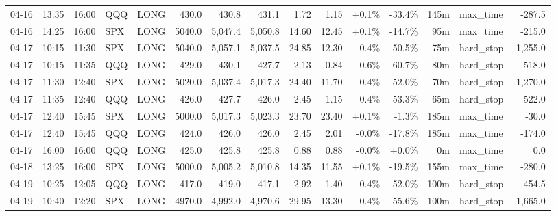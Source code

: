 \documentclass[11pt,a4paper,twoside]{article}
\begin{document}
\begin{landscape}
\begin{center}
\begin{longtable}{>{\color{txtmain}}l l l l l r r r r r r r r >{\color{txtmain}}l r}
04-16 & 13:35 & 16:00 & QQQ & LONG & 430.0 & 430.8 & 431.1 & 1.72 & 1.15 & \textcolor{wingreen}{+0.1\%} & \textcolor{lossred}{-33.4\%} & 145m & max\_time & \textcolor{lossred}{-287.5} \\
04-16 & 14:25 & 16:00 & SPX & LONG & 5040.0 & 5,047.4 & 5,050.8 & 14.60 & 12.45 & \textcolor{wingreen}{+0.1\%} & \textcolor{lossred}{-14.7\%} & 95m & max\_time & \textcolor{lossred}{-215.0} \\
04-17 & 10:15 & 11:30 & SPX & LONG & 5040.0 & 5,057.1 & 5,037.5 & 24.85 & 12.30 & \textcolor{lossred}{-0.4\%} & \textcolor{lossred}{-50.5\%} & 75m & hard\_stop & \textcolor{lossred}{-1,255.0} \\
04-17 & 10:15 & 11:35 & QQQ & LONG & 429.0 & 430.1 & 427.7 & 2.13 & 0.84 & \textcolor{lossred}{-0.6\%} & \textcolor{lossred}{-60.7\%} & 80m & hard\_stop & \textcolor{lossred}{-518.0} \\
04-17 & 11:30 & 12:40 & SPX & LONG & 5020.0 & 5,037.4 & 5,017.3 & 24.40 & 11.70 & \textcolor{lossred}{-0.4\%} & \textcolor{lossred}{-52.0\%} & 70m & hard\_stop & \textcolor{lossred}{-1,270.0} \\
04-17 & 11:35 & 12:40 & QQQ & LONG & 426.0 & 427.7 & 426.0 & 2.45 & 1.15 & \textcolor{lossred}{-0.4\%} & \textcolor{lossred}{-53.3\%} & 65m & hard\_stop & \textcolor{lossred}{-522.0} \\
04-17 & 12:40 & 15:45 & SPX & LONG & 5000.0 & 5,017.3 & 5,023.3 & 23.70 & 23.40 & \textcolor{wingreen}{+0.1\%} & \textcolor{lossred}{-1.3\%} & 185m & max\_time & \textcolor{lossred}{-30.0} \\
04-17 & 12:40 & 15:45 & QQQ & LONG & 424.0 & 426.0 & 426.0 & 2.45 & 2.01 & \textcolor{lossred}{-0.0\%} & \textcolor{lossred}{-17.8\%} & 185m & max\_time & \textcolor{lossred}{-174.0} \\
04-17 & 16:00 & 16:00 & QQQ & LONG & 425.0 & 425.8 & 425.8 & 0.88 & 0.88 & \textcolor{lossred}{-0.0\%} & \textcolor{wingreen}{+0.0\%} & 0m & max\_time & \textcolor{wingreen}{0.0} \\
04-18 & 13:25 & 16:00 & SPX & LONG & 5000.0 & 5,005.2 & 5,010.8 & 14.35 & 11.55 & \textcolor{wingreen}{+0.1\%} & \textcolor{lossred}{-19.5\%} & 155m & max\_time & \textcolor{lossred}{-280.0} \\
04-19 & 10:25 & 12:05 & QQQ & LONG & 417.0 & 419.0 & 417.1 & 2.92 & 1.40 & \textcolor{lossred}{-0.4\%} & \textcolor{lossred}{-52.0\%} & 100m & hard\_stop & \textcolor{lossred}{-454.5} \\
04-19 & 10:40 & 12:20 & SPX & LONG & 4970.0 & 4,992.0 & 4,970.6 & 29.95 & 13.30 & \textcolor{lossred}{-0.4\%} & \textcolor{lossred}{-55.6\%} & 100m & hard\_stop & \textcolor{lossred}{-1,665.0} \\

\end{longtable}
\end{center}
\end{landscape}
\end{document}
